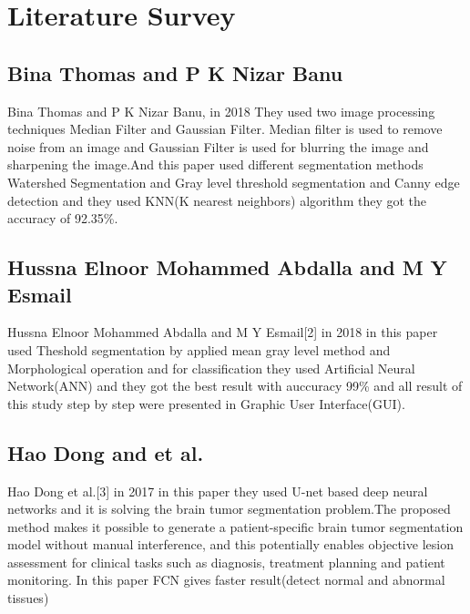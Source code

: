 
\chapter{Literature Survey} %

\label{Chapter3} %



  \section{Bina Thomas and P K Nizar Banu \cite{ref1}}
  
  Bina Thomas and P K Nizar Banu,  in 2018 They used two image processing techniques  Median Filter and Gaussian Filter. Median filter is used to remove noise from an image and Gaussian Filter is used for blurring the image and sharpening the image.And this paper used different segmentation methods Watershed Segmentation and Gray level threshold segmentation and Canny edge detection and they used KNN(K nearest neighbors) algorithm they got the accuracy of 92.35\%.
  
  \section{Hussna Elnoor Mohammed Abdalla and M Y Esmail \cite{ref2}}
  
  Hussna Elnoor Mohammed Abdalla and M Y Esmail[2] in 2018 in this paper used Theshold segmentation by applied mean gray level method and  Morphological  operation and for classification they used Artificial Neural Network(ANN) and they got the best result with auccuracy 99\% and all result of this study step by step were presented in Graphic User Interface(GUI).
  
  \section{Hao Dong and  et al. \cite{ref3}}
  
  Hao Dong et al.[3] in 2017  in this paper they used U-net based deep neural networks and it is solving the brain tumor segmentation problem.The proposed method makes it possible to generate a patient-specific brain tumor segmentation model without manual interference, and this potentially enables objective lesion assessment for clinical tasks such as diagnosis, treatment planning and patient monitoring. In this paper FCN gives faster result(detect normal and abnormal tissues)
  
